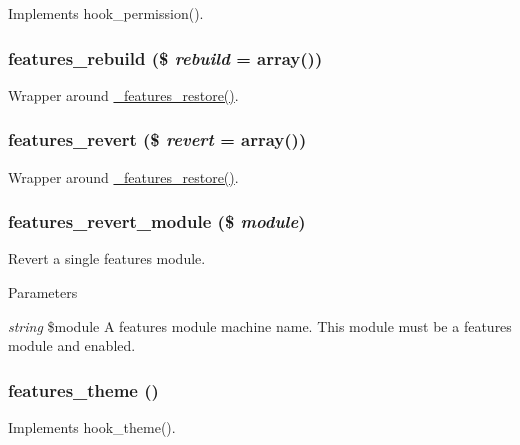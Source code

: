 \label{features_8module_a8798acbb3fe11426ba45f33a83e055b6}
Implements hook\_\-permission(). \hypertarget{features_8module_a059a6b5b807abf2d3004beae665cd41c}{
\subsubsection[{features\_\-rebuild}]{\setlength{\rightskip}{0pt plus 5cm}features\_\-rebuild (\$ {\em rebuild} = {\ttfamily array()})}}
\label{features_8module_a059a6b5b807abf2d3004beae665cd41c}
Wrapper around \hyperlink{features_8module_a0298400d481d56cee72177e00c1777cd}{\_\-features\_\-restore()}. \hypertarget{features_8module_a2387a306760f9e3f11596672883ad181}{
\subsubsection[{features\_\-revert}]{\setlength{\rightskip}{0pt plus 5cm}features\_\-revert (\$ {\em revert} = {\ttfamily array()})}}
\label{features_8module_a2387a306760f9e3f11596672883ad181}
Wrapper around \hyperlink{features_8module_a0298400d481d56cee72177e00c1777cd}{\_\-features\_\-restore()}. \hypertarget{features_8module_a7d98a16c1662382dae41746df94b8e86}{
\subsubsection[{features\_\-revert\_\-module}]{\setlength{\rightskip}{0pt plus 5cm}features\_\-revert\_\-module (\$ {\em module})}}
\label{features_8module_a7d98a16c1662382dae41746df94b8e86}
Revert a single features module.


\begin{DoxyParams}{Parameters}
\item[{\em string}]\$module A features module machine name. This module must be a features module and enabled. \end{DoxyParams}
\hypertarget{features_8module_aa4bc5c89bc3ae19889dc444bf408608d}{
\subsubsection[{features\_\-theme}]{\setlength{\rightskip}{0pt plus 5cm}features\_\-theme ()}}
\label{features_8module_aa4bc5c89bc3ae19889dc444bf408608d}
Implements hook\_\-theme(). 